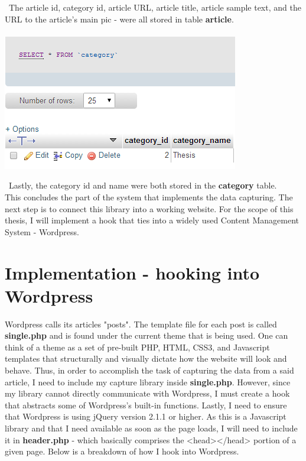 \documentclass[12pt]{article}
\begin{document}
\noindent\ The article id, category id, article URL, article title, article sample text, and the URL to the article's main pic - were all stored in table \textbf{article}. \\ \\

\noindent\includegraphics[scale=0.7]{img/visit4}

\noindent\ Lastly, the category id and name were both stored in the \textbf{category} table. \\

This concludes the part of the system that implements the data capturing. The next step is to connect this library into a working website. For the scope of this thesis, I will implement a hook that ties into a widely used Content Management System - Wordpress. 

\vfill

\section{Implementation - hooking into Wordpress}
Wordpress calls its articles "posts". The template file for each post is called \textbf{single.php} and is found under the current theme that is being used. One can think of a theme as a set of pre-built PHP, HTML, CSS3, and Javascript templates that structurally and visually dictate how the website will look and behave. Thus, in order to accomplish the task of capturing the data from a said article, I need to include my capture library inside \textbf{single.php}. However, since my library cannot directly communicate with Wordpress, I must create a hook that abstracts some of Wordpress's built-in functions. Lastly, I need to ensure that Wordpress is using jQuery version 2.1.1 or higher. As this is a Javascript library and that I need available as soon as the page loads, I will need to include it in \textbf{header.php} - which basically comprises the <head></head> portion of a given page. Below is a breakdown of how I hook into Wordpress.
\end{document}
